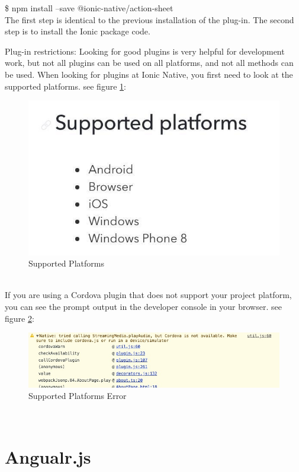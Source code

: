 \$ npm install --save @ionic-native/action-sheet \\ The first step is identical to the previous installation of the plug-in. The second step is to install the Ionic package code.
\item Plug-in restrictions: Looking for good plugins is very helpful for development work, but not all plugins can be used on all platforms, and not all methods can be used. When looking for plugins at Ionic Native, you first need to look at the supported platforms. see figure \ref{fig:5.11 cubed graph}:
\begin{figure}[h]
	\centering
	\includegraphics[scale=0.8]{img/ioniccordova.png}
	\caption{Supported Platforms}
	\label{fig:5.11 cubed graph}
\end{figure}
\\ If you are using a Cordova plugin that does not support your project platform, you can see the prompt output in the developer console in your browser. see figure \ref{fig:5.12 cubed graph}:
\begin{figure}[h]
	\centering
	\includegraphics[scale=0.5]{img/ioniccordova1.png}
	\caption{Supported Platforms Error}
	\label{fig:5.12 cubed graph}
\end{figure}
\\ \section{Angualr.js}
